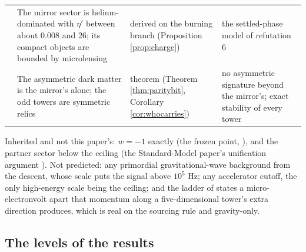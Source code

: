 \documentclass[11pt]{article}
\theoremstyle{definition}
\begin{document}
\begin{center}
\begin{tabular}{>{\raggedright\arraybackslash}p{0.5cm}>{\raggedright\arraybackslash}p{5.2cm}>{\raggedright\arraybackslash}p{2.4cm}>{\raggedright\arraybackslash}p{5.6cm}}
14 & The mirror sector is helium-dominated with $\eta'$ between about $0.008$ and $26$; its compact objects are bounded by microlensing & derived on the burning branch (Proposition \ref{prop:charge}) & the settled-phase model of refutation 6 \\[2pt]
15 & The asymmetric dark matter is the mirror's alone; the odd towers are symmetric relics & theorem (Theorem \ref{thm:paritybit}, Corollary \ref{cor:whocarries}) & no asymmetric signature beyond the mirror's; exact stability of every tower \\
\bottomrule
\end{tabular}
\end{center}

Inherited and not this paper's: $w = -1$ exactly (the frozen point, \cite[Prop.~4.2]{ButlerT10}), and the partner sector below the ceiling (the Standard-Model paper's unification argument \cite{ButlerT12}). Not predicted: any primordial gravitational-wave background from the descent, whose scale puts the signal above $10^{5}$ Hz; any accelerator cutoff, the only high-energy scale being the ceiling; and the ladder of states a micro-electronvolt apart that momentum along a five-dimensional tower's extra direction produces, which is real on the sourcing rule and gravity-only.

\subsection*{The levels of the results}
\end{document}
